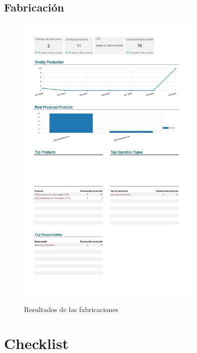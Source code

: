 \documentclass{report}
\begin{document}
        \section*{Fabricación}
            \begin{figure}[H]
                \centering
                \includegraphics[width=0.8\textwidth]{./img/Fabricacion1.png}
                \includegraphics[width=0.8\textwidth]{./img/Fabricacion2.png}
                \caption{Resultados de las fabricaciones}
            \end{figure}
    \chapter{Checklist}
\end{document}
